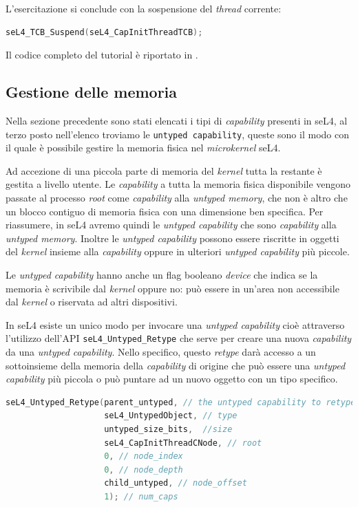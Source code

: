 L'esercitazione si conclude con la sospensione del \textit{thread} corrente:
\begin{lstlisting}[language=C++]
seL4_TCB_Suspend(seL4_CapInitThreadTCB);
\end{lstlisting}
Il codice completo del tutorial è riportato in \cite{capability}.

\subsection{Gestione delle memoria}
Nella sezione precedente sono stati elencati i tipi di \textit{capability} presenti in seL4, al terzo posto nell'elenco troviamo le \texttt{untyped capability}, queste sono il modo con il quale è possibile gestire la memoria fisica nel \textit{microkernel} seL4.

Ad accezione di una piccola parte di memoria del \textit{kernel} tutta la restante è gestita a livello utente. Le \textit{capability} a tutta la memoria fisica disponibile vengono passate al processo \textit{root} come \textit{capability} alla \textit{untyped memory}, che non è altro che un blocco contiguo di memoria fisica con una dimensione ben specifica. Per riassumere, in seL4 avremo quindi le \textit{untyped capability} che sono \textit{capability} alla \textit{untyped memory}. Inoltre le \textit{untyped capability} possono essere riscritte in oggetti del \textit{kernel} insieme alla \textit{capability} oppure in ulteriori \textit{untyped capability} più piccole.

Le \textit{untyped capability} hanno anche un flag booleano \textit{device} che indica se la memoria è scrivibile dal \textit{kernel} oppure no: può essere in un'area non accessibile dal \textit{kernel} o riservata ad altri dispositivi.

In seL4 esiste un unico modo per invocare una \textit{untyped capability} cioè attraverso l'utilizzo dell'API \texttt{seL4\_Untyped\_Retype} che serve per creare una nuova \textit{capability} da una \textit{untyped capability}. Nello specifico, questo \textit{retype} darà accesso a un sottoinsieme della memoria della \textit{capability} di origine che può essere una \textit{untyped capability} più piccola o può puntare ad un nuovo oggetto con un tipo specifico.
\begin{lstlisting}[language=C++]
seL4_Untyped_Retype(parent_untyped, // the untyped capability to retype
                    seL4_UntypedObject, // type
                    untyped_size_bits,  //size
                    seL4_CapInitThreadCNode, // root
                    0, // node_index
                    0, // node_depth
                    child_untyped, // node_offset
                    1); // num_caps
\end{lstlisting}


